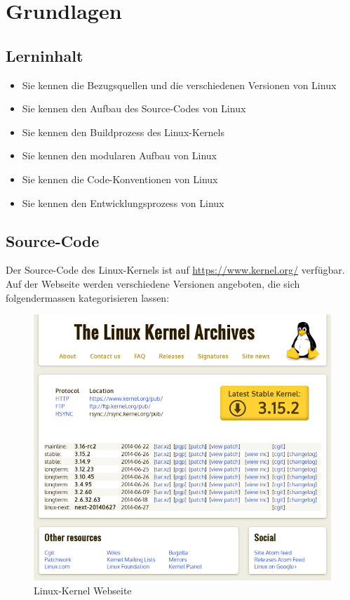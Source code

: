 \section{Grundlagen}

\subsection{Lerninhalt}
\begin{itemize}
   \item Sie kennen die Bezugsquellen und die verschiedenen Versionen von Linux
   \item Sie kennen den Aufbau des Source-Codes von Linux
   \item Sie kennen den Buildprozess des Linux-Kernels
   \item Sie kennen den modularen Aufbau von Linux
   \item Sie kennen die Code-Konventionen von Linux
   \item Sie kennen den Entwicklungsprozess von Linux
\end{itemize}

\subsection{Source-Code} 


Der Source-Code des Linux-Kernels ist auf \url{https://www.kernel.org/} verfügbar.
Auf der Webseite werden verschiedene Versionen angeboten, die sich folgendermassen kategorisieren lassen:
\\

\begin{figure}[h!]
   \begin{center}
      \includegraphics[scale=0.5]{images/kernel_org}
   \end{center}
   \caption[Kernel.org]{Linux-Kernel Webseite}
\end{figure}



